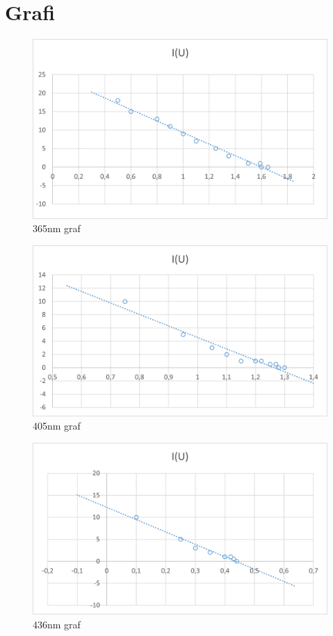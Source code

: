 \documentclass[a4paper]{report}
\begin{document}
\chapter*{Grafi}

\begin{figure}[htp]
    \centering
    \includegraphics[width=\textwidth]{energija in frekvenca graf 1.png}
    \caption{365nm graf}
    
\end{figure}

\begin{figure}[htp]
    \centering
    \includegraphics[width=\textwidth]{energija in frekvenca graf 2.png}
    \caption{405nm graf}

\end{figure}

\begin{figure}[htp]
    \centering
    \includegraphics[width=\textwidth]{energija in frekvenca graf 3.png}
    \caption{436nm graf}

\end{figure}
\end{document}
